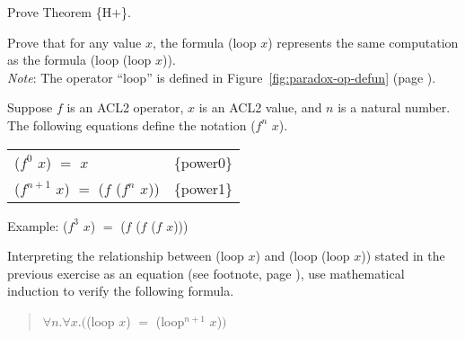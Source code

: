 \begin{ExerciseList}
\Exercise Prove Theorem \{H$+$\}.

\Exercise
Prove that for any value $x$, the formula (loop $x$) represents
the same computation as the formula (loop (loop $x$)).\\
\emph{Note}: The operator ``loop'' is defined in
Figure~\ref{fig:paradox-op-defun} (page \pageref{fig:paradox-op-defun}).

\Exercise
Suppose $f$ is an ACL2 operator, $x$ is an ACL2 value,
and $n$ is a natural number.
The following equations define the notation ($f^n$ $x$).
\begin{center}
\begin{tabular}{ll}
($f^0$ $x$) $=$ $x$                    &\{power0\} \\
($f^{n+1}$ $x$) $=$ ($f$ ($f^n$ $x$))  &\{power1\} \\
\end{tabular}
Example: ($f^3$ $x$) $=$ ($f$ ($f$ ($f$ $x$)))
\end{center}
Interpreting the relationship between (loop $x$) and (loop (loop $x$))
stated in the previous exercise
as an equation (see footnote, page \pageref{caveat:equality-for-loop}),
use mathematical induction to verify the following formula.
\begin{quote}
$\forall n.\forall x.($(loop $x$) $=$ (loop$^{n+1}$ $x$)$)$
\end{quote}

\end{ExerciseList}



